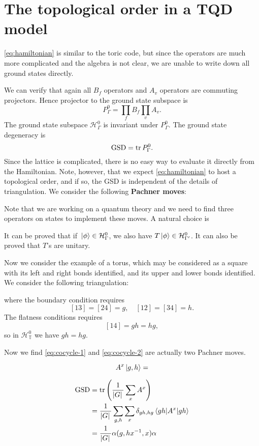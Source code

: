 \documentclass[hyperref, a4paper]{article}
\newcommand*{\concept}[1]{{\textbf{#1}}}
\begin{document}
\section{The topological order in a TQD model}

\eqref{eq:hamiltonian} is similar to the toric code, but since the operators are much more complicated 
and the algebra is not clear, we are unable to write down all ground states directly. 

We can verify that again all $B_f$ operators and $A_v$ operators are commuting projectors. 
Hence projector to the ground state subspace is 
\begin{equation}
    P^0_\Gamma = \prod_f B_f \prod_v A_v.
\end{equation}
The ground state subspace $\mathcal{H}^0_\Gamma$ is invariant under $P^0_\Gamma$. The ground state degeneracy is 
\begin{equation}
    \text{GSD} = \trace P^0_\Gamma.
\end{equation}
Since the lattice is complicated, there is no easy way to evaluate it directly from the Hamiltonian.
Note, however, that we expect \eqref{eq:hamiltonian} to host a topological order, and if so, the GSD 
is independent of the details of triangulation. We consider the following \concept{Pachner moves}:



Note that we are working on a quantum theory and we need to find three operators on states to implement 
these moves. A natural choice is 



It can be proved that if $\ket*{\phi} \in \mathcal{H}^0_\Gamma$, we also 
have $T \ket*{\phi} \in \mathcal{H}^0_{\Gamma'}$. It can also be proved that $T$'s are unitary.

Now we consider the example of a torus, which may be considered as a square with its left and right 
bonds identified, and its upper and lower bonds identified. We consider the following triangulation:

where the boundary condition requires 
\[
    [13]=[24] = g, \quad [12] = [34] = h.
\]
The flatness conditions requires 
\[
    [14] = gh = hg, 
\]
so in $\mathcal{H}^0_\mathbb{T}$ we have $gh = hg$. 


Now we find \eqref{eq:cocycle-1} and \eqref{eq:cocycle-2} are actually two Pachner moves. 

\begin{equation}
    A^x \ket*{g, h} = 
\end{equation}

\begin{equation}
    \begin{aligned}
        \text{GSD} &= \trace \left( \frac{1}{\abs*{G}} \sum_x A^x \right) \\
        &= \frac{1}{\abs*{G}} \sum_{g, h} \sum_x \delta_{gh, hg} \expval*{A^x}{gh} \\
        &= \frac{1}{\abs*{G}} \alpha(g, hx^{-1}, x) \alpha
    \end{aligned}
\end{equation}
\end{document}
